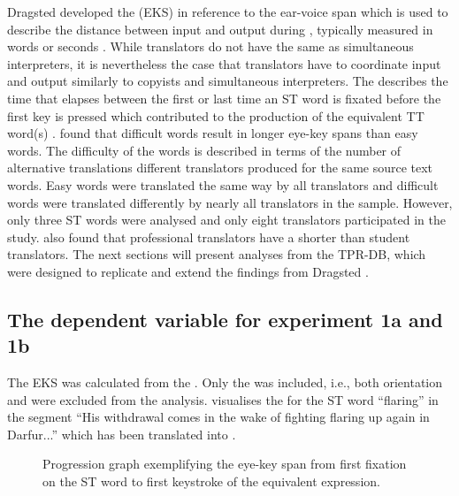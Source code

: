 \documentclass[output=paper]{LSP/langsci}
\begin{document}
Dragsted \citep{Dragsted2008,Dragsted2010} developed the  (EKS) in reference to the ear-voice span which is used to describe the distance between input and output during , typically measured in words or seconds \citep[e.g.][]{Defrancq2015}. While translators do not have the same  as simultaneous interpreters, it is nevertheless the case that translators have to coordinate input and output similarly to copyists and simultaneous interpreters. The  describes the time that elapses between the first or last time an ST word is fixated before the first key is pressed which contributed to the production of the equivalent TT word(s) \citep[51]{Dragsted2010}. \citet{Hansen2008} found that difficult words result in longer eye-key spans than easy words. The difficulty of the words is described in terms of the number of alternative translations different translators produced for the same source text words. Easy words were translated the same way by all translators and difficult words were translated differently by nearly all translators in the sample. However, only three ST words were analysed and only eight translators participated in the study. \citet{Dragsted2010} also found that professional translators have a shorter  than student translators. The next sections will present analyses from the TPR-DB, which were designed to replicate and extend the findings from Dragsted \citep{Dragsted2008,Dragsted2010}.

\subsection{The dependent variable for experiment 1a and 1b}
\largerpage
The EKS was calculated from the . Only the  was included, i.e., both orientation and  were excluded from the analysis.  visualises the  for the ST word ``flaring'' in the segment ``His withdrawal comes in the wake of fighting flaring up again in Darfur...'' which has been translated into .


\begin{figure}
\caption{Progression graph exemplifying the eye-key span from first fixation on the ST word to first keystroke of the equivalent expression.}
\label{schaeffer-carl:fig:2}
\end{figure}
\end{document}
